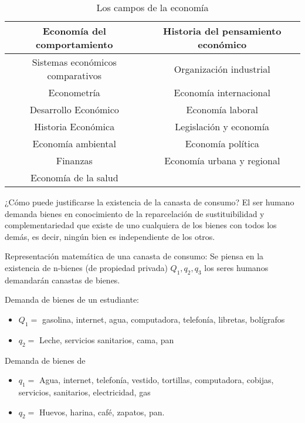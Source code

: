 \begin{table}[h!]
    \centering
    \begin{tabular}{@{}cc@{}}
    \toprule
    Economía del comportamiento      & Historia del pensamiento económico \\ \midrule
    Sistemas económicos comparativos & Organización industrial            \\
    Econometría                      & Economía internacional             \\
    Desarrollo Económico             & Economía laboral                   \\
    Historia Económica               & Legislación y economía             \\
    Economía ambiental               & Economía política                  \\
    Finanzas                         & Economía urbana y regional         \\
    Economía de la salud             &                                    \\ \bottomrule
    \end{tabular}
    \caption{Los campos de la economía}
    \label{tabe4} 
\end{table}
¿Cómo puede justificarse la existencia de la canasta de consumo? El ser humano demanda bienes en conocimiento de la reparcelación de sustituibilidad y complementariedad que existe de uno cualquiera de los bienes con todos los demás, es decir, ningún bien es independiente de los otros.

Representación matemática de una canasta de consumo: Se piensa en la existencia de n-bienes (de propiedad privada) $Q_1,q_2,q_3$ los seres humanos demandarán canastas de bienes.

Demanda de bienes de un estudiante:
\begin{itemize}
    \item $Q_1=$ gasolina, internet, agua, computadora, telefonía, libretas, bolígrafos
    \item $q_2=$ Leche, servicios sanitarios, cama, pan
\end{itemize}
Demanda de bienes de
\begin{itemize}
    \item $q_1=$ Agua, internet, telefonía, vestido, tortillas, computadora, cobijas, servicios, sanitarios, electricidad, gas
    \item $q_2=$ Huevos, harina, café, zapatos, pan.
\end{itemize}
